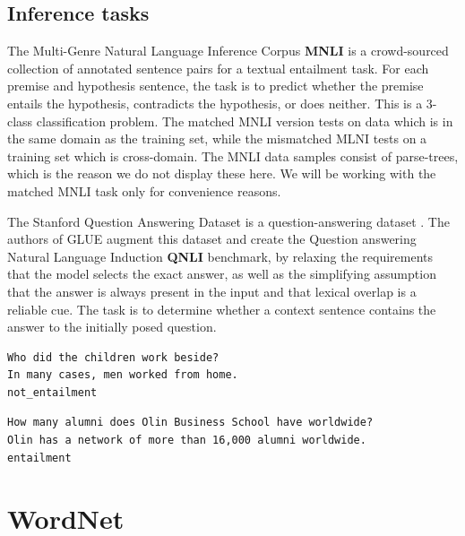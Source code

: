 \documentclass[a4paper,12pt,oneside,openright]{report}
\begin{document}
\quad

\subsection{Inference tasks}

The Multi-Genre Natural Language Inference Corpus \textbf{MNLI} \cite{N18-1101} \cite{bowman2015} is a crowd-sourced collection of annotated sentence pairs for a textual entailment task.
For each premise and hypothesis sentence, the task is to predict whether the premise entails the hypothesis, contradicts the hypothesis, or does neither.
This is a 3-class classification problem.
The matched MNLI version tests on data which is in the same domain as the training set, while the mismatched MLNI tests on a training set which is cross-domain.
The MNLI data samples consist of parse-trees, which is the reason we do not display these here.
We will be working with the matched MNLI task only for convenience reasons.

The Stanford Question Answering Dataset is a question-answering dataset \cite{rajpurkar2016}. 
The authors of GLUE augment this dataset and create the Question answering Natural Language Induction \textbf{QNLI} benchmark, by relaxing the requirements that the model selects the exact answer, as well as the simplifying assumption that the answer is always present in the input and that lexical overlap is a reliable cue.
The task is to determine whether a context sentence contains the answer to the initially posed question. 

\quad

\begin{tcolorbox}
\begin{verbatim}
Who did the children work beside?	
In many cases, men worked from home.
not_entailment
\end{verbatim}
\end{tcolorbox}

\quad

\begin{tcolorbox}
\begin{verbatim}
How many alumni does Olin Business School have worldwide?
Olin has a network of more than 16,000 alumni worldwide.
entailment
\end{verbatim}
\end{tcolorbox}

\section{WordNet}
\label{appendix:wordnet}
\end{document}
